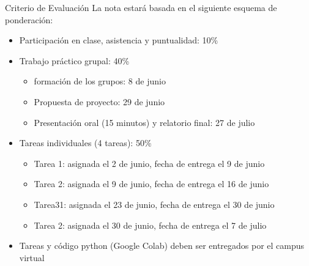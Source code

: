 \documentclass[xcolor=dvipsnames]{beamer}
\begin{document}
\begin{frame}{Criterio de Evaluación}
La nota estará basada en el siguiente esquema de ponderación: 
\begin{itemize}
\item Participación en clase, asistencia y puntualidad: 10\%
\item<2-> Trabajo práctico grupal: 40\% 
\begin{itemize}
\item<3-> formación de los grupos: 8 de junio 
\item<3-> Propuesta de proyecto: 29 de junio
\item<3-> Presentación oral (15 minutos) y relatorio final: 27 de julio
\end{itemize}
\item<4-> Tareas individuales (4 tareas): 50\%
\begin{itemize}
\item<5-> Tarea 1: asignada el 2 de junio, fecha de entrega el 9 de junio
\item<5-> Tarea 2: asignada el 9 de junio, fecha de entrega el 16 de junio
\item<5-> Tarea31: asignada el 23 de junio, fecha de entrega el 30 de junio
\item<5-> Tarea 2: asignada el 30 de junio, fecha de entrega el 7 de julio
\end{itemize}
\item<6-> Tareas y código python (Google Colab) deben ser entregados por el campus virtual
\end{itemize}
\end{frame}
\end{document}
